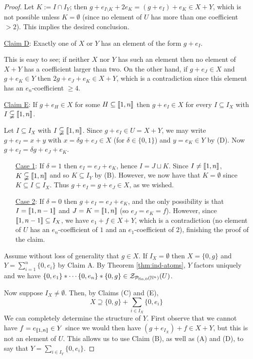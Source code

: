 \begin{proof}
Let $K := I\cap I_Y$; then $g + e_{I\setminus K} + 2e_K = (g+e_I) + e_K \in X+Y$, which is not possible unless $K=\emptyset$ (since no element of $U$ has more than one coefficient $>2$).
This implies the desired conclusion.

\noindent\underline{Claim D}: Exactly one of $X$ or $Y$ has an element of the form $g + e_I$. 

This is easy to see; if neither $X$ nor $Y$ has such an element then no element of $X+Y$ has a coefficient larger than two.
On the other hand, if $g+e_J\in X$ and $g+e_K\in Y$ then $2g + e_J + e_K \in X+Y$, which is a contradiction since this element has an $e_n$-coefficient $\ge 4$.

\noindent\underline{Claim E}: If $g+ e_H\in X$ for some $H\subseteq \llbracket 1,n \rrbracket$ then $g + e_I \in X$ for every $I\subseteq I_X$ with $I\subsetneqq \llbracket 1,n\rrbracket$. 

Let $I \subseteq I_X$ with $I\subsetneqq \llbracket1,n\rrbracket$.
Since $g+e_I\in U = X+Y$, we may write $g+e_I = x +y$ with $x = \delta g + e_J\in X$ (for $\delta\in \{0,1\}$) and $y=e_K\in Y$ by (D).
Now $g + e_I = \delta g + e_J + e_K$.
\begin{itemize}
\item[\underline{Case 1}:] If $\delta = 1$ then $e_I = e_J + e_K$, hence $I = J\sqcup K$. 
Since $I\neq \llbracket1,n\rrbracket$, $K\subsetneqq \llbracket 1,n \rrbracket$ and so $K\subseteq I_Y$ by (B).
However, we now have that $K = \emptyset$ since $K\subseteq I \subseteq I_X$.
Thus $g + e_I = g + e_J \in X$, as we wished.
\item[\underline{Case 2}:] If $\delta = 0$ then $g + e_I = e_J + e_K$, and the only possibility is that $I = \llbracket 1,n-1\rrbracket$ and $J = K = \llbracket 1,n\rrbracket$ (so $e_J = e_K = f$).
However, since $\llbracket 1,n-1 \rrbracket \subseteq I_X$, we have $e_1 + f \in X+Y$, which is a contradiction (no element of $U$ has an $e_n$-coefficient of $1$ and an $e_1$-coefficient of $2$), finishing the proof of the claim.
\end{itemize}

Assume without loss of generality that $g\in X$.
If $I_X = \emptyset$ then $X = \{0,g\}$ and $Y = \sum_{i=1}^n \{0,e_i\}$ by Claim A.
By Theorem \ref{thm:ind-atoms}, $Y$ factors uniquely and we have $\{0,e_1\}*\cdots \{0,e_n\}*\{0,g\}\in \mathcal{Z}_{\mathcal{P}_{\textrm{fin}, 0}(\mathbb{N}^n)}(U)$.

Now suppose $I_X \neq \emptyset$.
Then, by Claims (C) and (E), 
\[X \supseteq \{0,g\} + \sum_{i\in I_X} \{0,e_i\} \tag{1} \label{factor-includes} \]
We can completely determine the structure of $Y$.
First observe that we cannot have $f=e_{\llbracket1,n\rrbracket}\in Y$ since we would then have $(g+e_{I_X})+f \in X+Y$, but this is not an element of $U$.
This allows us to use Claim (B), as well as (A) and (D), to say that $Y = \sum_{i\in I_Y} \{0,e_i\}$.


\end{proof}
